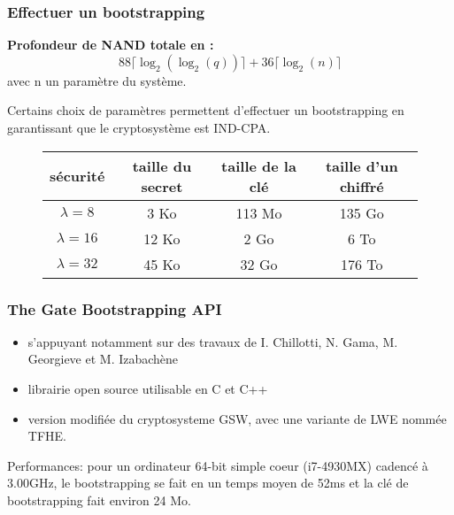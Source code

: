 \documentclass[10pt,xcolor={usenames,dvipsnames}]{beamer}
\begin{document}

\begin{frame} 
\frametitle{Effectuer un bootstrapping}

\textbf{Profondeur de NAND totale en :} \
\[88 \lceil \log_2(\log_2(q)) \rceil + 36 \lceil \log_2(n) \rceil\]
avec n un paramètre du système.

Certains choix de paramètres permettent d'effectuer un bootstrapping en garantissant que le cryptosystème est IND-CPA.
\pause

\begin{figure}
\begin{tabular}{|c|c|c|c|}
\hline
sécurité & taille du secret & taille de la clé & taille d'un chiffré \\
\hline
$\lambda = 8$ & 3 Ko & 113 Mo & 135 Go \\
\hline
$\lambda = 16$ & 12 Ko & 2 Go & 6 To \\
\hline
$\lambda = 32$ & 45 Ko & 32 Go & 176 To \\
\hline
\end{tabular}
\end{figure}
\end{frame}


\begin{frame} 
\frametitle{The Gate Bootstrapping API}
\begin{itemize}
\item s'appuyant notamment sur des travaux de I. Chillotti, N. Gama, M. Georgieve et M. Izabachène 
\item librairie open source utilisable en C et C++ 
\item version modifiée du cryptosysteme GSW, avec une variante de LWE nommée TFHE.
\end{itemize}
Performances:
pour un ordinateur 64-bit simple coeur (i7-4930MX) cadencé à 3.00GHz, le bootstrapping se fait en un temps moyen de 52ms
et la clé de bootstrapping fait environ 24 Mo.
 

\end{frame} 
\end{document}
